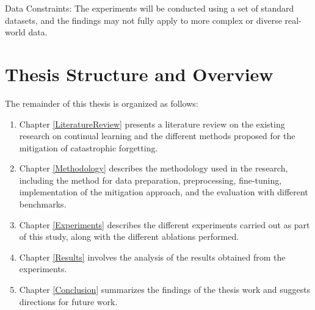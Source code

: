 Data Constraints: The experiments will be conducted using a set of standard datasets, and the findings may not fully apply to more complex or diverse real-world data.



\section{Thesis Structure and Overview}

The remainder of this thesis is organized as follows:
\begin{enumerate}
    \item Chapter \ref{LiteratureReview} presents a literature review on the existing research on continual learning and the different methods proposed for the mitigation of catastrophic forgetting.
    \item Chapter \ref{Methodology} describes the methodology used in the research, including the method for data preparation, preprocessing, fine-tuning, implementation of the mitigation approach, and the evaluation with different benchmarks.
    \item Chapter \ref{Experiments} describes the different experiments carried out as part of this study, along with the different ablations performed.
    \item Chapter \ref{Results} involves the analysis of the results obtained from the experiments.
    \item Chapter \ref{Conclusion} summarizes the findings of the thesis work and suggests directions for future work.

\end{enumerate}